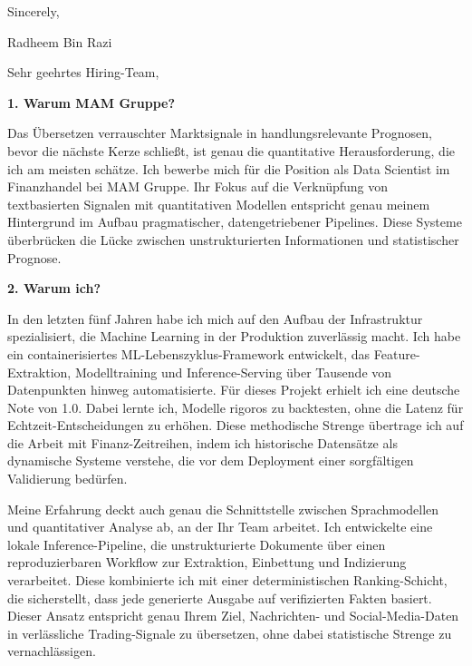 \documentclass[11pt,a4paper]{coverletter}
\begin{document}
\closing{Sincerely,}{Radheem Bin Razi}

\clearpage
{}


\opening{Sehr geehrtes Hiring-Team,}

\vspace{8pt}\noindent\textbf{1. Warum MAM Gruppe?}\par\vspace{3pt}

Das Übersetzen verrauschter Marktsignale in handlungsrelevante Prognosen, bevor die nächste Kerze schließt, ist genau die quantitative Herausforderung, die ich am meisten schätze. Ich bewerbe mich für die Position als Data Scientist im Finanzhandel bei MAM Gruppe. Ihr Fokus auf die Verknüpfung von textbasierten Signalen mit quantitativen Modellen entspricht genau meinem Hintergrund im Aufbau pragmatischer, datengetriebener Pipelines. Diese Systeme überbrücken die Lücke zwischen unstrukturierten Informationen und statistischer Prognose.

\vspace{8pt}\noindent\textbf{2. Warum ich?}\par\vspace{3pt}

In den letzten fünf Jahren habe ich mich auf den Aufbau der Infrastruktur spezialisiert, die Machine Learning in der Produktion zuverlässig macht. Ich habe ein containerisiertes ML-Lebenszyklus-Framework entwickelt, das Feature-Extraktion, Modelltraining und Inference-Serving über Tausende von Datenpunkten hinweg automatisierte. Für dieses Projekt erhielt ich eine deutsche Note von 1.0. Dabei lernte ich, Modelle rigoros zu backtesten, ohne die Latenz für Echtzeit-Entscheidungen zu erhöhen. Diese methodische Strenge übertrage ich auf die Arbeit mit Finanz-Zeitreihen, indem ich historische Datensätze als dynamische Systeme verstehe, die vor dem Deployment einer sorgfältigen Validierung bedürfen.

Meine Erfahrung deckt auch genau die Schnittstelle zwischen Sprachmodellen und quantitativer Analyse ab, an der Ihr Team arbeitet. Ich entwickelte eine lokale Inference-Pipeline, die unstrukturierte Dokumente über einen reproduzierbaren Workflow zur Extraktion, Einbettung und Indizierung verarbeitet. Diese kombinierte ich mit einer deterministischen Ranking-Schicht, die sicherstellt, dass jede generierte Ausgabe auf verifizierten Fakten basiert. Dieser Ansatz entspricht genau Ihrem Ziel, Nachrichten- und Social-Media-Daten in verlässliche Trading-Signale zu übersetzen, ohne dabei statistische Strenge zu vernachlässigen.
\end{document}

